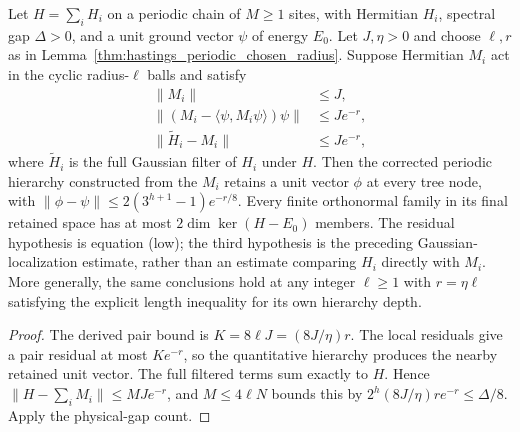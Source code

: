 \begin{lemma}
    \label{thm:hastings_periodic_physical_log_squared}
    \leanok
    Let $H=\sum_iH_i$ on a periodic chain of $M\ge1$ sites, with
    Hermitian $H_i$, spectral gap $\Delta>0$, and a unit ground vector
    $\psi$ of energy $E_0$. Let $J,\eta>0$ and choose $\ell,r$ as in
    Lemma~\ref{thm:hastings_periodic_chosen_radius}.
    Suppose Hermitian $M_i$ act in the cyclic radius-$\ell$ balls and satisfy
    \begin{align*}
        \|M_i\|                                  & \le J,       \\
        \|(M_i-\langle\psi,M_i\psi\rangle)\psi\| & \le Je^{-r}, \\
        \|\widetilde H_i-M_i\|                   & \le Je^{-r},
    \end{align*}
    where $\widetilde H_i$ is the full Gaussian filter of $H_i$ under $H$.
    Then the corrected periodic hierarchy constructed from the $M_i$
    retains a unit vector $\phi$ at every tree node, with
    $\|\phi-\psi\|\le2(3^{h+1}-1)e^{-r/8}$.
    Every finite orthonormal family in its final retained space has at
    most $2\dim\ker(H-E_0)$ members. The residual hypothesis is equation
    (low); the third hypothesis is the preceding Gaussian-localization
    estimate, rather than an estimate comparing $H_i$ directly with $M_i$.
    More generally, the same conclusions hold at any integer $\ell\ge1$
    with $r=\eta\ell$ satisfying the explicit length inequality for its
    own hierarchy depth.
\end{lemma}
\begin{proof}\leanok
    The derived pair bound is $K=8\ell J=(8J/\eta)r$.
    The local residuals give a pair residual at most $K e^{-r}$, so the
    quantitative hierarchy produces the nearby retained unit vector.
    The full filtered terms sum exactly to $H$. Hence
    $\|H-\sum_iM_i\|\le MJe^{-r}$, and $M\le4\ell N$ bounds this by
    $2^h(8J/\eta)r e^{-r}\le\Delta/8$. Apply the physical-gap count.
\end{proof}

